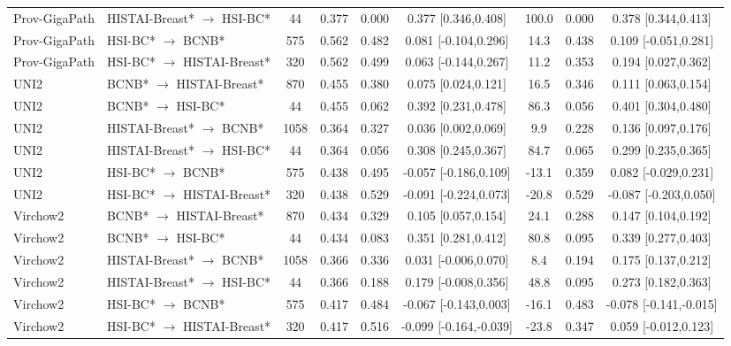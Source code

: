 \begin{table}[htbp]
{\begin{tabular}{l l c c c c c c c}
Prov-GigaPath & HISTAI-Breast* $\rightarrow$ HSI-BC* & 44 & 0.377 & 0.000 & 0.377 [0.346,0.408] & 100.0 & 0.000 & 0.378 [0.344,0.413] \\
Prov-GigaPath & HSI-BC* $\rightarrow$ BCNB* & 575 & 0.562 & 0.482 & 0.081 [-0.104,0.296] & 14.3 & 0.438 & 0.109 [-0.051,0.281] \\
Prov-GigaPath & HSI-BC* $\rightarrow$ HISTAI-Breast* & 320 & 0.562 & 0.499 & 0.063 [-0.144,0.267] & 11.2 & 0.353 & 0.194 [0.027,0.362] \\
UNI2 & BCNB* $\rightarrow$ HISTAI-Breast* & 870 & 0.455 & 0.380 & 0.075 [0.024,0.121] & 16.5 & 0.346 & 0.111 [0.063,0.154] \\
UNI2 & BCNB* $\rightarrow$ HSI-BC* & 44 & 0.455 & 0.062 & 0.392 [0.231,0.478] & 86.3 & 0.056 & 0.401 [0.304,0.480] \\
UNI2 & HISTAI-Breast* $\rightarrow$ BCNB* & 1058 & 0.364 & 0.327 & 0.036 [0.002,0.069] & 9.9 & 0.228 & 0.136 [0.097,0.176] \\
UNI2 & HISTAI-Breast* $\rightarrow$ HSI-BC* & 44 & 0.364 & 0.056 & 0.308 [0.245,0.367] & 84.7 & 0.065 & 0.299 [0.235,0.365] \\
UNI2 & HSI-BC* $\rightarrow$ BCNB* & 575 & 0.438 & 0.495 & -0.057 [-0.186,0.109] & -13.1 & 0.359 & 0.082 [-0.029,0.231] \\
UNI2 & HSI-BC* $\rightarrow$ HISTAI-Breast* & 320 & 0.438 & 0.529 & -0.091 [-0.224,0.073] & -20.8 & 0.529 & -0.087 [-0.203,0.050] \\
Virchow2 & BCNB* $\rightarrow$ HISTAI-Breast* & 870 & 0.434 & 0.329 & 0.105 [0.057,0.154] & 24.1 & 0.288 & 0.147 [0.104,0.192] \\
Virchow2 & BCNB* $\rightarrow$ HSI-BC* & 44 & 0.434 & 0.083 & 0.351 [0.281,0.412] & 80.8 & 0.095 & 0.339 [0.277,0.403] \\
Virchow2 & HISTAI-Breast* $\rightarrow$ BCNB* & 1058 & 0.366 & 0.336 & 0.031 [-0.006,0.070] & 8.4 & 0.194 & 0.175 [0.137,0.212] \\
Virchow2 & HISTAI-Breast* $\rightarrow$ HSI-BC* & 44 & 0.366 & 0.188 & 0.179 [-0.008,0.356] & 48.8 & 0.095 & 0.273 [0.182,0.363] \\
Virchow2 & HSI-BC* $\rightarrow$ BCNB* & 575 & 0.417 & 0.484 & -0.067 [-0.143,0.003] & -16.1 & 0.483 & -0.078 [-0.141,-0.015] \\
Virchow2 & HSI-BC* $\rightarrow$ HISTAI-Breast* & 320 & 0.417 & 0.516 & -0.099 [-0.164,-0.039] & -23.8 & 0.347 & 0.059 [-0.012,0.123] \\
\bottomrule
\end{tabular}}%
\end{table}

